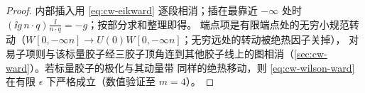 \begin{proof}
内部插入用 \cref{eq:cw-eikward} 逐段相消；插在最靠近 $-\infty$ 处时 $(\ii g\,n\cdot q)\frac{\ii}{n\cdot q}=-g$；按部分求和整理即得。
端点项是有限端点处的无穷小规范转动（$W[0,-\infty n]\to U(0)W[0,-\infty n]$；无穷远处的转动被绝热因子关掉），
对易子项则与该标量胶子经三胶子顶角连到其他胶子线上的图相消（\cref{sec:cw-ward}）。若标量胶子的极化与其动量带
同样的绝热移动，则 \cref{eq:cw-wilson-ward} 在有限 $\epsilon$ 下严格成立（数值验证至 $m=4$）。
\end{proof}
